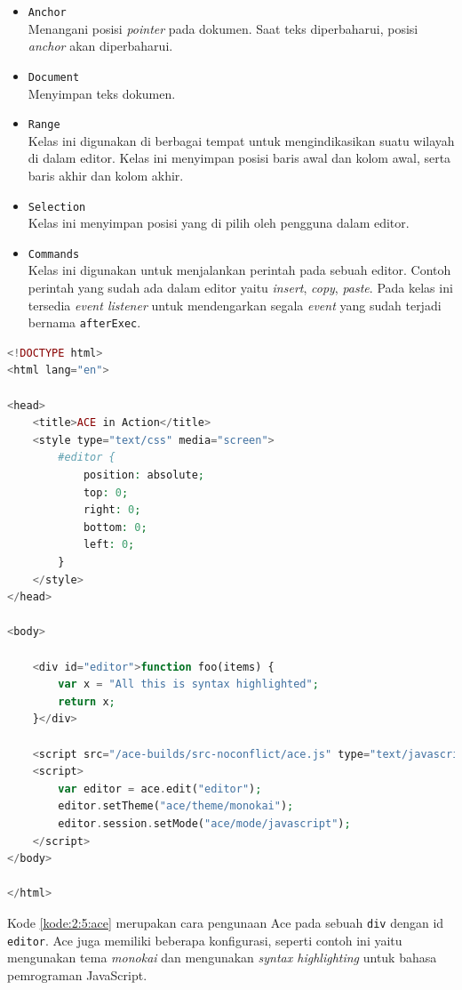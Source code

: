 \documentclass[a4paper,twoside]{article}
\begin{document}
\begin{enumerate}
\begin{itemize}
		      \item \verb|Anchor| \\
		            Menangani posisi \textit{pointer} pada dokumen. Saat teks diperbaharui, posisi \textit{anchor} akan diperbaharui.
		      \item \verb|Document| \\
		            Menyimpan teks dokumen.
		      \item \verb|Range| \\
		            Kelas ini digunakan di berbagai tempat untuk mengindikasikan suatu wilayah di dalam editor. Kelas ini menyimpan posisi baris awal dan kolom awal, serta baris akhir dan kolom akhir.
		      \item \verb|Selection| \\
		            Kelas ini menyimpan posisi yang di pilih oleh pengguna dalam editor.
		      \item \verb|Commands| \\
		            Kelas ini digunakan untuk menjalankan perintah pada sebuah editor. Contoh perintah yang sudah ada dalam editor yaitu \textit{insert}, \textit{copy}, \textit{paste}. Pada kelas ini tersedia \textit{event listener} untuk mendengarkan segala \textit{event} yang sudah terjadi bernama \verb|afterExec|.
	      \end{itemize}

	      \begin{lstlisting}[language={php}, caption={Contoh kode pengunaan Ace}, label={kode:2:5:ace}]
<!DOCTYPE html>
<html lang="en">

<head>
	<title>ACE in Action</title>
	<style type="text/css" media="screen">
		#editor { 
			position: absolute;
			top: 0;
			right: 0;
			bottom: 0;
			left: 0;
		}
	</style>
</head>

<body>

	<div id="editor">function foo(items) {
		var x = "All this is syntax highlighted";
		return x;
	}</div>
	
	<script src="/ace-builds/src-noconflict/ace.js" type="text/javascript" charset="utf-8"></script>
	<script>
		var editor = ace.edit("editor");
		editor.setTheme("ace/theme/monokai");
		editor.session.setMode("ace/mode/javascript");
	</script>
</body>

</html>
		  \end{lstlisting}

	      Kode \ref{kode:2:5:ace} merupakan cara pengunaan Ace pada sebuah \texttt{div} dengan id \texttt{editor}. Ace juga memiliki beberapa konfigurasi, seperti contoh ini yaitu mengunakan tema \textit{monokai} dan mengunakan \textit{syntax highlighting} untuk bahasa pemrograman JavaScript.


\end{enumerate}
\end{document}

